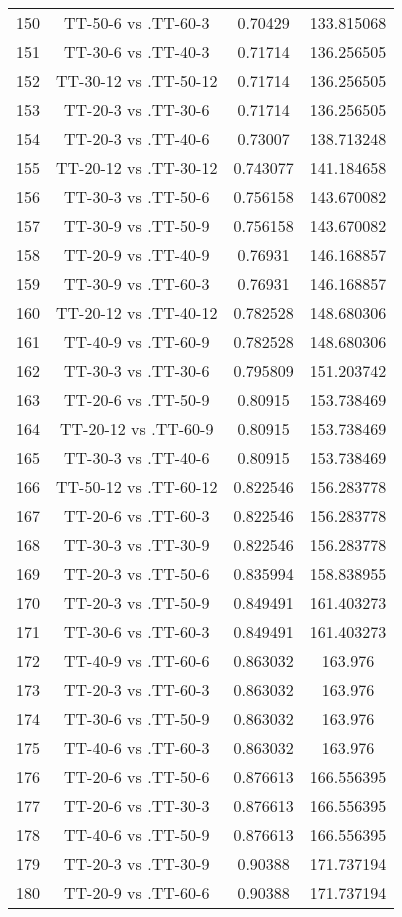 \documentclass[a4paper,10pt]{article}
\begin{document}
\begin{landscape}
\begin{table}[!htp]
\begin{tabular}{cccc}
150&TT-50-6 vs .TT-60-3&0.70429&133.815068\\
151&TT-30-6 vs .TT-40-3&0.71714&136.256505\\
152&TT-30-12 vs .TT-50-12&0.71714&136.256505\\
153&TT-20-3 vs .TT-30-6&0.71714&136.256505\\
154&TT-20-3 vs .TT-40-6&0.73007&138.713248\\
155&TT-20-12 vs .TT-30-12&0.743077&141.184658\\
156&TT-30-3 vs .TT-50-6&0.756158&143.670082\\
157&TT-30-9 vs .TT-50-9&0.756158&143.670082\\
158&TT-20-9 vs .TT-40-9&0.76931&146.168857\\
159&TT-30-9 vs .TT-60-3&0.76931&146.168857\\
160&TT-20-12 vs .TT-40-12&0.782528&148.680306\\
161&TT-40-9 vs .TT-60-9&0.782528&148.680306\\
162&TT-30-3 vs .TT-30-6&0.795809&151.203742\\
163&TT-20-6 vs .TT-50-9&0.80915&153.738469\\
164&TT-20-12 vs .TT-60-9&0.80915&153.738469\\
165&TT-30-3 vs .TT-40-6&0.80915&153.738469\\
166&TT-50-12 vs .TT-60-12&0.822546&156.283778\\
167&TT-20-6 vs .TT-60-3&0.822546&156.283778\\
168&TT-30-3 vs .TT-30-9&0.822546&156.283778\\
169&TT-20-3 vs .TT-50-6&0.835994&158.838955\\
170&TT-20-3 vs .TT-50-9&0.849491&161.403273\\
171&TT-30-6 vs .TT-60-3&0.849491&161.403273\\
172&TT-40-9 vs .TT-60-6&0.863032&163.976\\
173&TT-20-3 vs .TT-60-3&0.863032&163.976\\
174&TT-30-6 vs .TT-50-9&0.863032&163.976\\
175&TT-40-6 vs .TT-60-3&0.863032&163.976\\
176&TT-20-6 vs .TT-50-6&0.876613&166.556395\\
177&TT-20-6 vs .TT-30-3&0.876613&166.556395\\
178&TT-40-6 vs .TT-50-9&0.876613&166.556395\\
179&TT-20-3 vs .TT-30-9&0.90388&171.737194\\
180&TT-20-9 vs .TT-60-6&0.90388&171.737194\\

\end{tabular}
\end{table}
\end{landscape}
\end{document}
